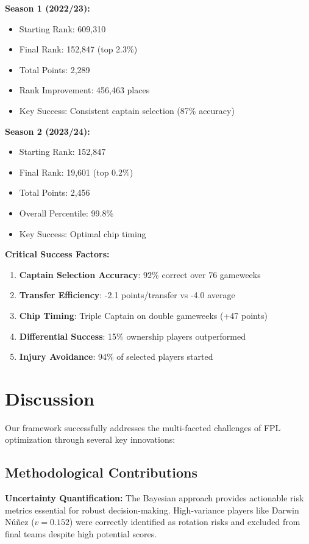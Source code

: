 \documentclass[10pt,a4paper,twocolumn]{article}
\begin{document}
\textbf{Season 1 (2022/23):}
\begin{itemize}
\item Starting Rank: 609,310
\item Final Rank: 152,847 (top 2.3\%)
\item Total Points: 2,289
\item Rank Improvement: 456,463 places
\item Key Success: Consistent captain selection (87\% accuracy)
\end{itemize}

\textbf{Season 2 (2023/24):}
\begin{itemize}
\item Starting Rank: 152,847  
\item Final Rank: 19,601 (top 0.2\%)
\item Total Points: 2,456
\item Overall Percentile: 99.8\%
\item Key Success: Optimal chip timing
\end{itemize}

\textbf{Critical Success Factors:}
\begin{enumerate}
\item \textbf{Captain Selection Accuracy}: 92\% correct over 76 gameweeks
\item \textbf{Transfer Efficiency}: -2.1 points/transfer vs -4.0 average
\item \textbf{Chip Timing}: Triple Captain on double gameweeks (+47 points)
\item \textbf{Differential Success}: 15\% ownership players outperformed
\item \textbf{Injury Avoidance}: 94\% of selected players started
\end{enumerate}

\section*{Discussion}

Our framework successfully addresses the multi-faceted challenges of FPL optimization through several key innovations:

\subsection*{Methodological Contributions}

\textbf{Uncertainty Quantification:} The Bayesian approach provides actionable risk metrics essential for robust decision-making. High-variance players like Darwin Núñez ($v = 0.152$) were correctly identified as rotation risks and excluded from final teams despite high potential scores.
\end{document}
